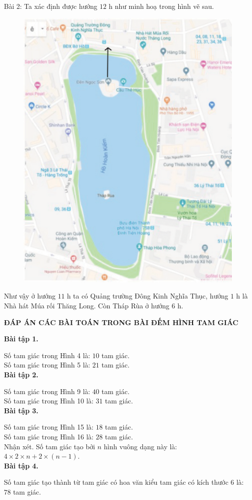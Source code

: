 Bài 2: Ta xác định được hướng $12$ h như minh hoạ trong hình vẽ sau.
 \begin{figure}[H]
	\centering
	\vspace*{-5pt}
	\captionsetup{labelformat= empty, justification=centering}
	\includegraphics[width=0.5\linewidth]{bando.pdf}
	\vspace*{-15pt}
\end{figure}
 Như vậy ở hướng $11$ h ta có Quảng trường Đông Kinh Nghĩa Thục, hướng $1$ h là Nhà hát Múa rối Thăng Long. Còn Tháp Rùa ở hướng $6$ h.
\begin{center}
	\textbf{ĐÁP ÁN CÁC BÀI TOÁN TRONG BÀI ĐẾM HÌNH TAM GIÁC}
\end{center}
\textbf{Bài tập 1.}

Số tam giác trong Hình 4 là: $10$ tam giác.\\
Số tam giác trong Hình 5 là: $21$ tam giác.\\
\textbf{Bài tập 2.}

Số tam giác trong Hình 9 là: $40$ tam giác.\\
Số tam giác trong Hình 10 là: $31$ tam giác.\\
\textbf{Bài tập 3.}

Số tam giác trong Hình 15 là: $18$ tam giác.\\
Số tam giác trong Hình 16 là: $28$ tam giác.\\
Nhận xét. Số tam giác tạo bởi $n$ hình vuông dạng này là: $4\times 2\times n + 2\times (n-1)$.\\

\textbf{Bài tập 4.}

Số tam giác tạo thành từ tam giác có hoa văn kiểu tam giác có kích thước 6 là: $78$ tam giác.

